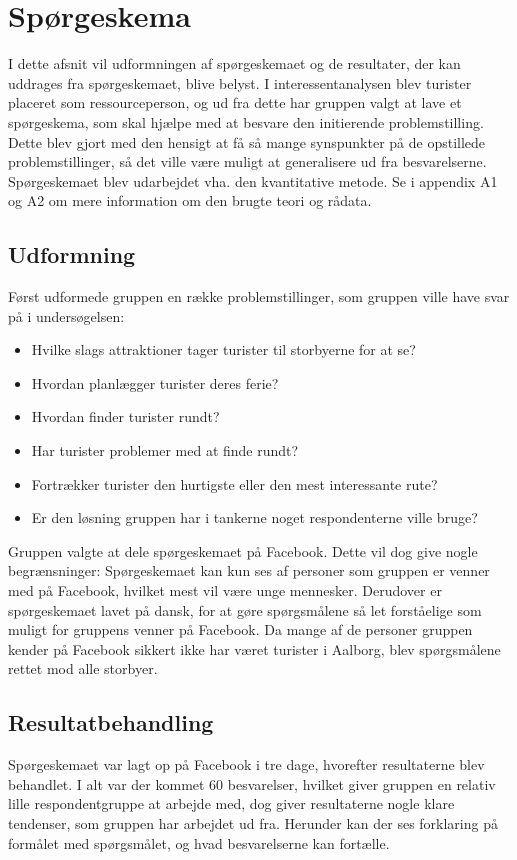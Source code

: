 \section{Spørgeskema}
I dette afsnit vil udformningen af spørgeskemaet og de resultater, der kan uddrages fra spørgeskemaet, blive belyst. I interessentanalysen blev turister placeret som ressourceperson, og ud fra dette har gruppen valgt at lave et spørgeskema, som skal hjælpe med at besvare den initierende problemstilling. Dette blev gjort med den hensigt at få så mange synspunkter på de opstillede problemstillinger, så det ville være muligt at generalisere ud fra besvarelserne. Spørgeskemaet blev udarbejdet vha. den kvantitative metode. Se i appendix A1 og A2 om mere information om den brugte teori og rådata.

\subsection{Udformning}
Først udformede gruppen en række problemstillinger, som gruppen ville have svar på i undersøgelsen: 
\begin{itemize}
	\item Hvilke slags attraktioner tager turister til storbyerne for at se?
	\item Hvordan planlægger turister deres ferie?
	\item Hvordan finder turister rundt?
	\item Har turister problemer med at finde rundt?
	\item Fortrækker turister den hurtigste eller den mest interessante rute?
	\item Er den løsning gruppen har i tankerne noget respondenterne ville bruge?
\end{itemize}
Gruppen valgte at dele spørgeskemaet på Facebook. Dette vil dog give nogle begrænsninger: Spørgeskemaet kan kun ses af personer som gruppen er venner med på Facebook, hvilket mest vil være unge mennesker. Derudover er spørgeskemaet lavet på dansk, for at gøre spørgsmålene så let forståelige som muligt for gruppens venner på Facebook. Da mange af de personer gruppen kender på Facebook sikkert ikke har været turister i Aalborg, blev spørgsmålene rettet mod alle storbyer.
\subsection{Resultatbehandling}
Spørgeskemaet var lagt op på Facebook i tre dage, hvorefter resultaterne blev behandlet. I alt var der kommet 60 besvarelser, hvilket giver gruppen en relativ lille respondentgruppe at arbejde med, dog giver resultaterne nogle klare tendenser, som gruppen har arbejdet ud fra. Herunder kan der ses forklaring på formålet med spørgsmålet, og hvad besvarelserne kan fortælle.

